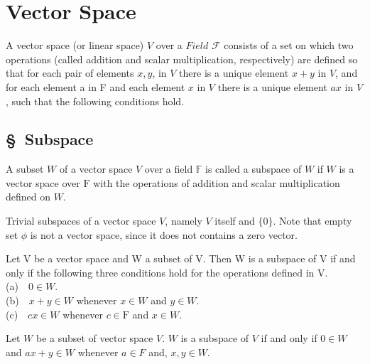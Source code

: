 \section{Vector Space}
 
\begin{defn}
 A vector space (or linear space) $V$ over a $Field$ $\mathcal{F}$ consists of a set on which two operations (called addition and scalar multiplication, respectively) are defined so that for each pair of elements $x, y$, in $V$ there is a unique element $x+y$ in $V$, and for each element a in F and each element $x$ in $V$ there is a unique element $ax$ in $V$, such that the following conditions hold.
\end{defn} 

\subsection*{\S\ Subspace }

\begin{defn}[Subspace]
	A subset $W$ of a vector space $V$ over a field $\mathbb{F}$ is called a subspace of $W$ if $W$ is a vector space over $\mathrm{F}$ with the operations of addition and scalar multiplication defined on $W$.
	
\end{defn}



\begin{rmk*}
	Trivial subspaces of a vector space $V$, namely $V$ itself and $\{0\}$. Note that empty set $\phi$ is not a vector space, since it does not contains a zero vector.
\end{rmk*}

\begin{thm}%
Let V be a vector space and W a subset of V. Then W is a subspace of V if and only if the following three conditions hold for the operations defined in V.
\\
(a)\ \ $0 \in W.$ \\
(b)\ \ $x+y \in W$ whenever $x \in W$ and $y \in W.$ \\
(c)\ \ $cx \in W$ whenever $c \in \mathrm{F}$ and $x \in W.$ \\

\end{thm}



\begin{cor} %
	Let $W$ be a subset of vector space $V$. $W$ is a subspace of $V$ if and only if $0\in W$ and $ax+y \in W$ whenever $a \in F$ and, $ x,y \in W$.
\end{cor}

